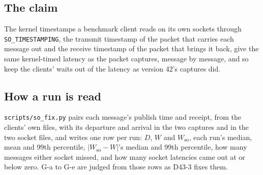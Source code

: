 \documentclass[11pt]{article}
\begin{document}
\subsection*{The claim}
The kernel timestamps a benchmark client reads on its own sockets through
\texttt{SO\_TIMESTAMPING}, the transmit timestamp of the packet that carries each message out and
the receive timestamp of the packet that brings it back, give the same kernel-timed latency as the
packet captures, message by message, and so keep the clients' waits out of the latency as version
42's captures did.

\subsection*{How a run is read}
\texttt{scripts/so\_fix.py} pairs each message's publish time and receipt, from the clients' own
files, with its departure and arrival in the two captures and in the two socket files, and writes
one row per run: $D$, $W$ and $W_{\mathrm{so}}$, each run's median, mean and 99th percentile,
$|W_{\mathrm{so}} - W|$'s median and 99th percentile, how many messages either socket missed, and
how many socket latencies came out at or below zero. G-a to G-e are judged from those rows as D43-3
fixes them.
\end{document}
